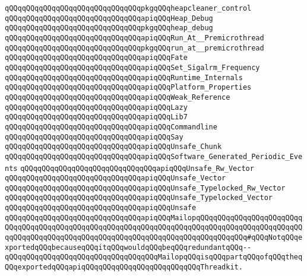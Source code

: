 \verb|qQQqqQQqqQQqqQQqqQQqqQQqqQQqqQQqpkgqQQqheapcleaner_control|\newline
\newline
\verb|qQQqqQQqqQQqqQQqqQQqqQQqqQQqqQQqapiqQQqHeap_Debug|\newline
\verb|qQQqqQQqqQQqqQQqqQQqqQQqqQQqqQQqpkgqQQqheap_debug|\newline
\newline
\verb|qQQqqQQqqQQqqQQqqQQqqQQqqQQqqQQqapiqQQqRun_At__Premicrothread|\newline
\verb|qQQqqQQqqQQqqQQqqQQqqQQqqQQqqQQqpkgqQQqrun_at__premicrothread|\newline
\newline
\verb|qQQqqQQqqQQqqQQqqQQqqQQqqQQqqQQqapiqQQqFate|\newline
\verb|qQQqqQQqqQQqqQQqqQQqqQQqqQQqqQQqapiqQQqSet_Sigalrm_Frequency|\newline
\verb|qQQqqQQqqQQqqQQqqQQqqQQqqQQqqQQqapiqQQqRuntime_Internals|\newline
\verb|qQQqqQQqqQQqqQQqqQQqqQQqqQQqqQQqapiqQQqPlatform_Properties|\newline
\verb|qQQqqQQqqQQqqQQqqQQqqQQqqQQqqQQqapiqQQqWeak_Reference|\newline
\verb|qQQqqQQqqQQqqQQqqQQqqQQqqQQqqQQqapiqQQqLazy|\newline
\verb|qQQqqQQqqQQqqQQqqQQqqQQqqQQqqQQqapiqQQqLib7|\newline
\verb|qQQqqQQqqQQqqQQqqQQqqQQqqQQqqQQqapiqQQqCommandline|\newline
\verb|qQQqqQQqqQQqqQQqqQQqqQQqqQQqqQQqapiqQQqSay|\newline
\newline
\verb|qQQqqQQqqQQqqQQqqQQqqQQqqQQqqQQqapiqQQqUnsafe_Chunk|\newline
\verb|qQQqqQQqqQQqqQQqqQQqqQQqqQQqqQQqapiqQQqSoftware_Generated_Periodic_Events|\newline
\verb|qQQqqQQqqQQqqQQqqQQqqQQqqQQqqQQqapiqQQqUnsafe_Rw_Vector|\newline
\verb|qQQqqQQqqQQqqQQqqQQqqQQqqQQqqQQqapiqQQqUnsafe_Vector|\newline
\verb|qQQqqQQqqQQqqQQqqQQqqQQqqQQqqQQqapiqQQqUnsafe_Typelocked_Rw_Vector|\newline
\verb|qQQqqQQqqQQqqQQqqQQqqQQqqQQqqQQqapiqQQqUnsafe_Typelocked_Vector|\newline
\verb|qQQqqQQqqQQqqQQqqQQqqQQqqQQqqQQqapiqQQqUnsafe|\newline
\newline
\verb|qQQqqQQqqQQqqQQqqQQqqQQqqQQqqQQqapiqQQqMailopqQQqqQQqqQQqqQQqqQQqqQQqqQQqqQQqqQQqqQQqqQQqqQQqqQQqqQQqqQQqqQQqqQQqqQQqqQQqqQQqqQQqqQQqqQQqqQQqqQQqqQQqqQQqqQQqqQQqqQQqqQQqqQQqqQQqqQQqqQQqqQQqqQQqqQQq#qQQqNotqQQqexportedqQQqbecauseqQQqitqQQqwouldqQQqbeqQQqredundantqQQq--qQQqqQQqqQQqqQQqqQQqqQQqqQQqqQQqqQQqMailopqQQqisqQQqpartqQQqofqQQqtheqQQqexportedqQQqapiqQQqqQQqqQQqqQQqqQQqqQQqqQQqThreadkit.|\newline
